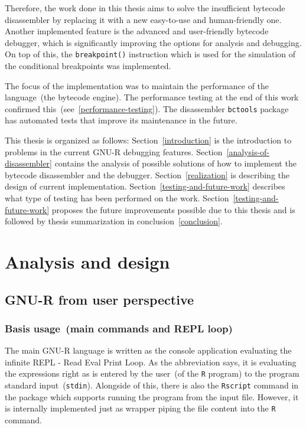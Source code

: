\documentclass[thesis=M,english]{FITthesis}[2018/10/20]
\newcommand{\code}[1]{\texttt{#1}}
\begin{document}
Therefore, the work done in this thesis aims to solve the insufficient bytecode disassembler by replacing it with a new easy-to-use and human-friendly one. Another implemented feature is the advanced and user-friendly bytecode debugger, which is significantly improving the options for analysis and debugging. On top of this, the \code{breakpoint()} instruction which is used for the simulation of the conditional breakpoints was implemented. 

The focus of the implementation was to maintain the performance of the language~(the bytecode engine). The performance testing at the end of this work confirmed this~(see~\ref{performance-testing}). The disassembler \code{bctools} package has automated tests that improve its maintenance in the future. 

This thesis is organized as follows: Section~\ref{introduction} is the introduction to problems in the current GNU-R debugging features. Section~\ref{analysis-of-disassembler} contains the analysis of possible solutions of how to implement the bytecode disassembler and the debugger. Section~\ref{realization} is describing the design of current implementation. Section~\ref{testing-and-future-work} describes what type of testing has been performed on the work. Section~\ref{testing-and-future-work} proposes the future improvements possible due to this thesis and is followed by thesis summarization in conclusion~\ref{conclusion}.


\chapter{Analysis and design}

\section{GNU-R from user perspective}\label{R-UI}

\subsection{Basis usage~(main commands and REPL loop)}\label{REPL}

The main GNU-R language is written as the console application evaluating the infinite REPL - Read Eval Print Loop. As the abbreviation says, it is evaluating the expressions right as is entered by the user~(of the \code{R} program) to the program standard input~(\code{stdin}). Alongside of this, there is also the \code{Rscript} command in the package which supports running the program from the input file. However, it is internally implemented just as wrapper piping the file content into the \code{R} command.
\end{document}
